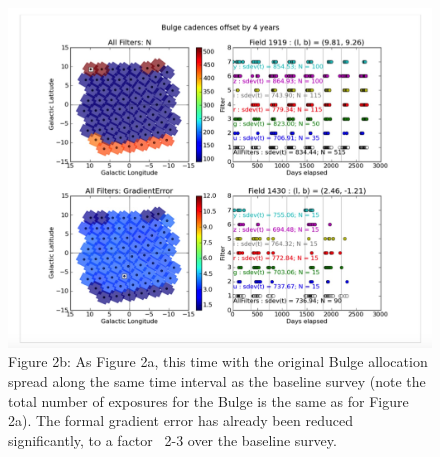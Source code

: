 \begin{figure}[h]
    \centering
    \includegraphics[width=1.0\textwidth]{bulge_fig2b.jpeg}
    \caption{\label{fig:bulge2b}
Figure 2b: As Figure 2a, this time with the original Bulge allocation spread along the same time interval as the baseline survey (note the total number of exposures for the Bulge is the same as for Figure 2a). The formal gradient error has already been reduced significantly, to a factor ~2-3 over the baseline survey. }
\end{figure}



